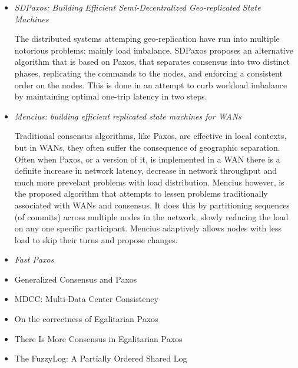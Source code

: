 \documentclass{article}
\begin{document}
\begin{itemize}
	\item
	\textit{SDPaxos: Building Efficient Semi-Decentralized Geo-replicated State Machines} \cite{zhao2018sdpaxos}

	The distributed systems attemping geo-replication have run into multiple notorious problems: mainly load imbalance.
	SDPaxos proposes an alternative algorithm that is based on Paxos, that separates consensus into two distinct phases, replicating the commands to the nodes, and enforcing a consistent order on the nodes.
	This is done in an attempt to curb workload imbalance by maintaining optimal one-trip latency in two steps.

	\item
	\textit{Mencius: building efficient replicated state machines for WANs} \cite{Mencius}

	Traditional consensus algorithms, like Paxos, are effective in local contexts, but in WANs, they often suffer the consequence of geographic separation.
	Often when Paxos, or a version of it, is implemented in a WAN there is a definite increase in network latency, decrease in network throughput and much more prevelant problems with load distribution.
	Mencius however, is the proposed algorithm that attempts to lessen problems traditionally associated with WANs and consensus.
	It does this by partitioning sequences (of commits) across multiple nodes in the network, slowly reducing the load on any one specific participant. Mencius adaptively allows nodes with less load to skip their turns and propose changes.

	\item
	\textit{Fast Paxos} \cite{lamport2006fast}

	

	\item{Generalized Consensus and Paxos \cite{lamport2005generalized}}

	\item{MDCC: Multi-Data Center Consistency \cite{MDCC}}

	\item{On the correctness of Egalitarian Paxos \cite{SutraEPaxos}}

	\item{There Is More Consensus in Egalitarian Paxos \cite{EPaxos}}

	\item{The FuzzyLog: A Partially Ordered Shared Log \cite{FuzzyLog}}
\end{itemize}
\end{document}
